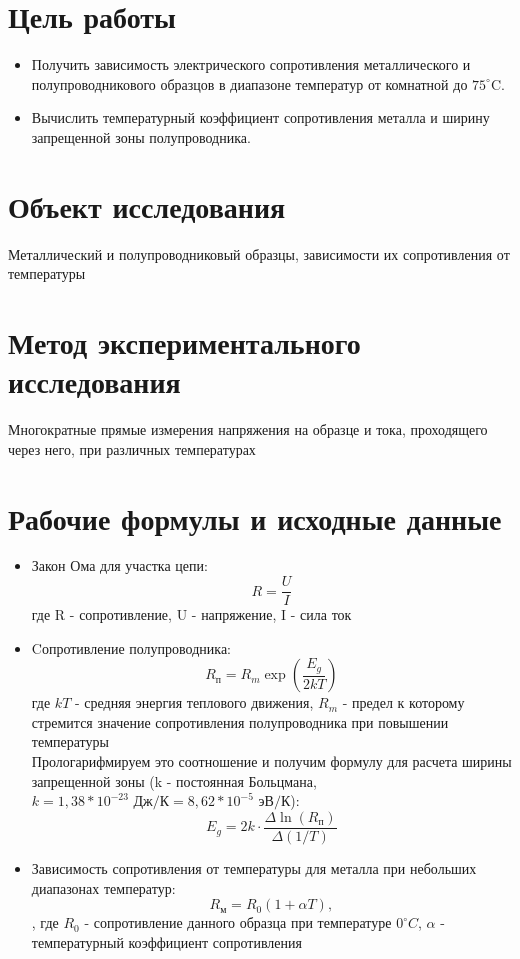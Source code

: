 \section{Цель работы}
\begin{itemize}
    \item Получить зависимость электрического сопротивления металлического и полупроводникового образцов в диапазоне температур от комнатной до $75^\circ$C.
    \item Вычислить температурный коэффициент сопротивления металла и ширину запрещенной зоны полупроводника.
\end{itemize}

\section{Объект исследования}
\noindent Металлический и полупроводниковый образцы, зависимости их сопротивления от температуры

\section{Метод экспериментального исследования}
\noindent Многократные прямые измерения напряжения на образце и тока, проходящего через него, при различных температурах

\section{Рабочие формулы и исходные данные}
\begin{itemize}
    \item Закон Ома для участка цепи:
    \begin{equation}
        R=\frac{U}{I}
        \label{eqn:OMM}
    \end{equation}
    где R - сопротивление, U - напряжение, I -  сила ток
    \item Cопротивление полупроводника:
    $$R_{\text{п}} = R_m\exp{(\frac{E_g}{2kT})}$$
     где $kT$ - средняя энергия теплового движения, $R_m$ - предел к которому стремится значение сопротивления полупроводника при повышении температуры\\
     
    Прологарифмируем это соотношение и получим формулу для расчета ширины запрещенной зоны (k - постоянная Больцмана, $k=1,38*10^{-23} \textit{ Дж/К}=8,62*10^{-5}\textit{ эВ/К}$):
    \begin{equation}
        E_g=2k \cdot \frac{\Delta \ln({R_{\text{п}}})}{\Delta (1/T)}
    \end{equation}
    \item Зависимость сопротивления от температуры для металла при небольших диапазонах температур:
    \begin{equation}
        R_{\text{м}} = R_0(1+\alpha T),
    \end{equation}
    , где $R_0$ - сопротивление данного образца при температуре $0^\circ C$, $\alpha$ - температурный коэффициент сопротивления
\end{itemize}

